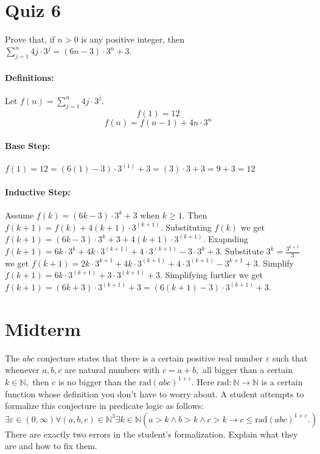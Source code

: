 \documentclass[letterpaper,12pt,addpoints,answers]{exam}
\begin{document}
\begin{questions}
    \section*{Quiz 6}


    \question[4] Prove that, if $n>0$ is any positive integer, then $\sum_{j=1}^n 4j\cdot 3^j=(6n-3)\cdot 3^n+3.$

    \begin{solutionorbox}[7in]
        \paragraph{Definitions:}
        Let $f(n)=\sum_{j=1}^n 4j\cdot 3^j$.
        $$f(1) = 12$$
        $$f(n) = f(n-1) + 4n \cdot 3^n$$

        \paragraph{Base Step:} $f(1) = 12 = (6(1) - 3) \cdot 3^{(1)} + 3 = (3) \cdot 3 + 3 = 9 + 3 = 12$
        \paragraph{Inductive Step:} Assume
        $f(k) = (6k-3)\cdot 3^k+3$ when $k \geq 1$.
        Then $f(k+1) = f(k) + 4(k+1) \cdot 3^{(k+1)}$.
        Substituting $f(k)$ we get $f(k+1) = (6k-3)\cdot 3^k+3 + 4(k+1) \cdot 3^{(k+1)}$.
        Exapnding $f(k+1) = 6k \cdot 3^k + 4k \cdot 3^{(k+1)} + 4 \cdot 3^{(k+1)} - 3 \cdot 3^k + 3$.
        Substitute $3^k = \frac{3^{k+1}}{3}$ we get $f(k+1) = 2k \cdot 3^{k+1} + 4k \cdot 3^{(k+1)} + 4 \cdot 3^{(k+1)} - 3^{k+1} + 3$.
        Simplify $f(k+1) = 6k \cdot 3^{(k+1)} + 3 \cdot 3^{(k+1)} + 3$.
        Simplifying further we get $f(k+1) = (6k + 3) \cdot 3^{(k+1)} + 3 = (6(k + 1) - 3) \cdot 3^{(k+1)} + 3$.
    \end{solutionorbox}

    \clearpage




    \section*{Midterm}

    \question[10] The $abc$ conjecture states that there is a certain positive real number $\varepsilon$ such that
    whenever $a,b,c$ are natural numbers with $c=a+b,$ all bigger than a certain $k\in \mathbb N,$ then $c$ is no bigger than the $\mathrm{rad}(abc)^{1+\varepsilon}.$ Here $\mathrm{rad}:\mathbb N\to \mathbb N$ is a certain function
    whose definition you don't have to worry about. A student attempts to formalize this conjecture in predicate
    logic as follows:
    \[\exists\varepsilon\in (0,\infty)\forall (a,b,c)\in \mathbb N^3\exists k\in \mathbb N (a>k\wedge b>k\wedge c>k\to c\le \mathrm{rad}(abc)^{1+\varepsilon}.) \]
    There are exactly two errors in the student's formalization. Explain what they are and how to fix them.


\end{questions}
\end{document}

